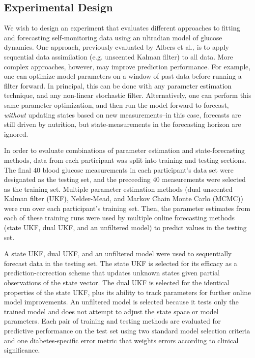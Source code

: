 \documentclass[10pt,letterpaper]{article}
\begin{document}
\subsection{Experimental Design}
We wish to design an experiment that evaluates different approaches to fitting and forecasting self-monitoring data using an ultradian model of glucose dynamics. One approach, previously evaluated by Albers et al., is to apply sequential data assimilation (e.g. unscented Kalman filter) to all data. More complex approaches, however, may improve prediction performance. For example, one can optimize model parameters on a window of past data before running a filter forward. In principal, this can be done with any parameter estimation technique, and any non-linear stochastic filter. Alternatively, one can perform this same parameter optimization, and then run the model forward to forecast, \emph{without} updating states based on new measurements--in this case, forecasts are still driven by nutrition, but state-measurements in the forecasting horizon are ignored. 

In order to evaluate combinations of parameter estimation and state-forecasting methods, data from each participant was split into training and testing sections.
The final $40$ blood glucose measurements in each participant's data set were 
designated as the testing set, and the preceeding $40$ measurements were selected as the training set.
Multiple parameter estimation methods (dual unscented Kalman filter (UKF), Nelder-Mead, and Markov Chain Monte Carlo (MCMC)) were run over each participant's training set.
Then, the parameter estimates from each of these training runs were used by multiple online forecasting methods (state UKF, dual UKF, and an unfiltered model) to predict values in the testing set.

A state UKF, dual UKF, and an unfiltered model were used to sequentially forecast data in the testing set. 
The state UKF is selected for its efficacy as a prediction-correction scheme that updates unknown states given partial observations of the state vector.
The dual UKF is selected for the identical properties of the state UKF, plus its ability to track parameters for further online model improvements.
An unfiltered model is selected because it tests only the trained model and does not attempt to adjust the state space or model parameters.
Each pair of training and testing methods are evaluated for predictive performance on the test set using two standard model selection criteria and one diabetes-specific error metric that weights errors according to clinical significance. 
\end{document}
